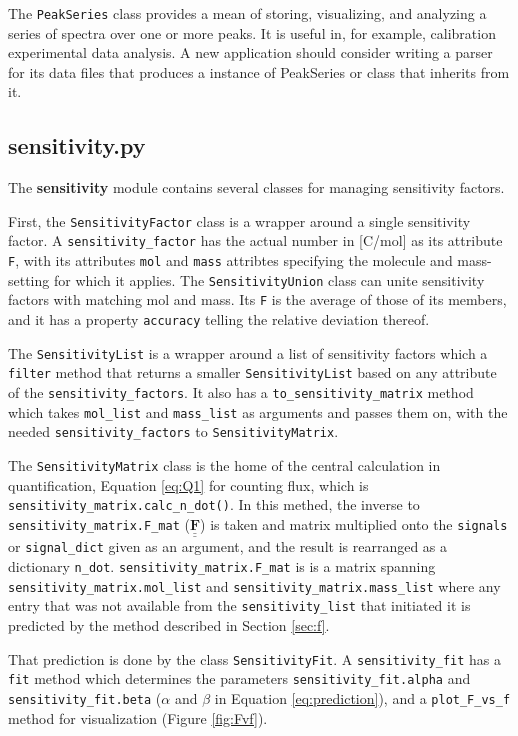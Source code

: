 \documentclass{article}
\newcommand{\code}[1]{\colorbox{codegray}{\lstinline{#1}}}
\newcommand{\mat}[1]{\underline{\underline{\mathbf{#1}}}}
\begin{document}
The \code{PeakSeries} class provides a mean of storing, visualizing, and analyzing a series of spectra over one or more peaks. It is useful in, for example, calibration experimental data analysis. A new application should consider writing a parser for its data files that produces a instance of PeakSeries or class that inherits from it.

\subsection{sensitivity.py}\label{sec:sensitivity}

The \textbf{sensitivity} module contains several classes for managing sensitivity factors. 

First, the \code{SensitivityFactor} class is a wrapper around a single sensitivity factor. A \code{sensitivity_factor} has the actual number in [C/mol] as its attribute \code{F}, with its attributes \code{mol} and \code{mass} attribtes specifying the molecule and mass-setting for which it applies. The \code{SensitivityUnion} class can unite sensitivity factors with matching mol and mass. Its \code{F} is the average of those of its members, and it has a property \code{accuracy} telling the relative deviation thereof. 

The \code{SensitivityList} is a wrapper around a list of sensitivity factors which a \code{filter} method that returns a smaller \code{SensitivityList} based on any attribute of the \code{sensitivity_factors}. It also has a \code{to_sensitivity_matrix} method which takes \code{mol_list} and \code{mass_list} as arguments and passes them on, with the needed \code{sensitivity_factors} to \code{SensitivityMatrix}.

The \code{SensitivityMatrix} class is the home of the central calculation in quantification, Equation \ref{eq:Q1} for counting flux, which is \code{sensitivity_matrix.calc_n_dot()}. In this methed, the inverse to \code{sensitivity_matrix.F_mat} ($\mat{F}$) is taken and matrix multiplied onto the \code{signals} or \code{signal_dict} given as an argument, and the result is rearranged as a dictionary \code{n_dot}. \code{sensitivity_matrix.F_mat} is is a matrix spanning \code{sensitivity_matrix.mol_list} and \code{sensitivity_matrix.mass_list} where any entry that was not available from the \code{sensitivity_list} that initiated it is predicted by the method described in Section \ref{sec:f}. 

That prediction is done by the class \code{SensitivityFit}. A \code{sensitivity_fit} has a \code{fit} method which determines the parameters \code{sensitivity_fit.alpha} and \code{sensitivity_fit.beta} ($\alpha$ and $\beta$ in Equation \ref{eq:prediction}), and a \code{plot_F_vs_f} method for visualization (Figure \ref{fig:Fvf}).
\end{document}
